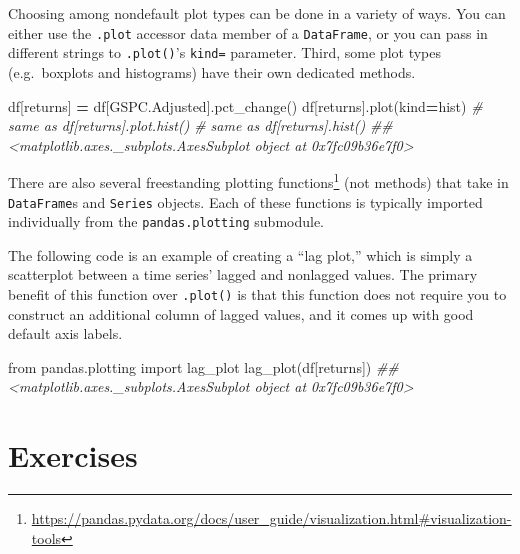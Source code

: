 \documentclass[
  12pt,
  krantz2]{krantz}
\makeatletter
\newenvironment{Shaded}{\begin{snugshade}}{\end{snugshade}}
\newcommand{\CommentTok}[1]{\textcolor[rgb]{0.37,0.37,0.37}{\textit{#1}}}
\newcommand{\ImportTok}[1]{#1}
\newcommand{\NormalTok}[1]{#1}
\newcommand{\OperatorTok}[1]{\textcolor[rgb]{0.43,0.43,0.43}{\textbf{#1}}}
\newcommand{\StringTok}[1]{\textcolor[rgb]{0.5,0.5,0.5}{#1}}
\renewcommand{\href}[2]{#2\footnote{\url{#1}}}
\newenvironment{kframe}{%
\medskip{}
\setlength{\fboxsep}{.8em}
 \def\at@end@of@kframe{}%
 \ifinner\ifhmode%
  \def\at@end@of@kframe{\end{minipage}}%
  \begin{minipage}{\columnwidth}%
 \fi\fi%
 \def\FrameCommand##1{\hskip\@totalleftmargin \hskip-\fboxsep
 \colorbox{shadecolor}{##1}\hskip-\fboxsep
     \hskip-\linewidth \hskip-\@totalleftmargin \hskip\columnwidth}%
 \MakeFramed {\advance\hsize-\width
   \@totalleftmargin\z@ \linewidth\hsize
   \@setminipage}}%
 {\par\unskip\endMakeFramed%
 \at@end@of@kframe}
\renewenvironment{Shaded}{\begin{kframe}}{\end{kframe}}
\makeatother
\begin{document}
Choosing among nondefault plot types can be done in a variety of ways. You can either use the \texttt{.plot} accessor data member of a \texttt{DataFrame}, or you can pass in different strings to \texttt{.plot()}'s \texttt{kind=} parameter. Third, some plot types (e.g.~boxplots and histograms) have their own dedicated methods.

\begin{Shaded}
\begin{Highlighting}[]
\NormalTok{df[}\StringTok{\textquotesingle{}returns\textquotesingle{}}\NormalTok{] }\OperatorTok{=}\NormalTok{ df[}\StringTok{\textquotesingle{}GSPC.Adjusted\textquotesingle{}}\NormalTok{].pct\_change()}
\NormalTok{df[}\StringTok{\textquotesingle{}returns\textquotesingle{}}\NormalTok{].plot(kind}\OperatorTok{=}\StringTok{\textquotesingle{}hist\textquotesingle{}}\NormalTok{)}
\CommentTok{\# same as df[\textquotesingle{}returns\textquotesingle{}].plot.hist()}
\CommentTok{\# same as df[\textquotesingle{}returns\textquotesingle{}].hist()}
\CommentTok{\#\# \textless{}matplotlib.axes.\_subplots.AxesSubplot object at 0x7fc09b36e7f0\textgreater{}}
\end{Highlighting}
\end{Shaded}

There are also \href{https://pandas.pydata.org/docs/user_guide/visualization.html\#visualization-tools}{several freestanding plotting functions} (not methods) that take in \texttt{DataFrame}s and \texttt{Series} objects. Each of these functions is typically imported individually from the \texttt{pandas.plotting} submodule.

The following code is an example of creating a ``lag plot,'' which is simply a scatterplot between a time series' lagged and nonlagged values. The primary benefit of this function over \texttt{.plot()} is that this function does not require you to construct an additional column of lagged values, and it comes up with good default axis labels.

\begin{Shaded}
\begin{Highlighting}[]
\ImportTok{from}\NormalTok{ pandas.plotting }\ImportTok{import}\NormalTok{ lag\_plot}
\NormalTok{lag\_plot(df[}\StringTok{\textquotesingle{}returns\textquotesingle{}}\NormalTok{])}
\CommentTok{\#\# \textless{}matplotlib.axes.\_subplots.AxesSubplot object at 0x7fc09b36e7f0\textgreater{}}
\end{Highlighting}
\end{Shaded}

\hypertarget{exercises-11}{%
\section{Exercises}\label{exercises-11}}
\end{document}
